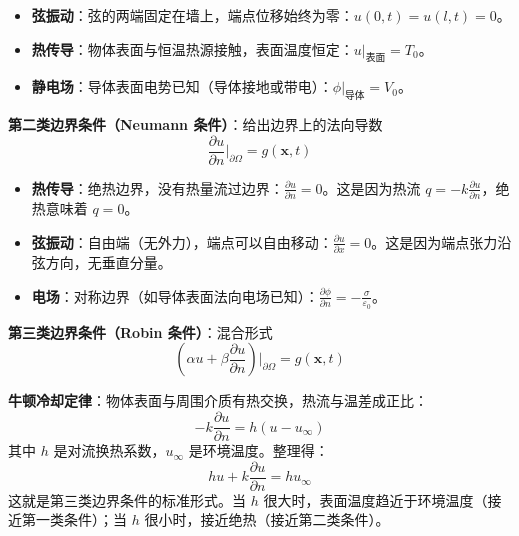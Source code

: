 \begin{tishi}[物理场景举例]
\begin{itemize}
    \item \textbf{弦振动}：弦的两端固定在墙上，端点位移始终为零：$u(0, t) = u(l, t) = 0$。
    \item \textbf{热传导}：物体表面与恒温热源接触，表面温度恒定：$u|_{\text{表面}} = T_0$。
    \item \textbf{静电场}：导体表面电势已知（导体接地或带电）：$\phi|_{\text{导体}} = V_0$。
\end{itemize}
\end{tishi}

\textbf{第二类边界条件（Neumann 条件）}：给出边界上的法向导数
\begin{equation}
    \frac{\partial u}{\partial n}\Big|_{\partial\Omega} = g(\boldsymbol{x}, t)
\end{equation}

\begin{tishi}[物理场景举例]
\begin{itemize}
    \item \textbf{热传导}：绝热边界，没有热量流过边界：$\frac{\partial u}{\partial n} = 0$。这是因为热流 $q = -k\frac{\partial u}{\partial n}$，绝热意味着 $q = 0$。
    \item \textbf{弦振动}：自由端（无外力），端点可以自由移动：$\frac{\partial u}{\partial x} = 0$。这是因为端点张力沿弦方向，无垂直分量。
    \item \textbf{电场}：对称边界（如导体表面法向电场已知）：$\frac{\partial \phi}{\partial n} = -\frac{\sigma}{\varepsilon_0}$。
\end{itemize}
\end{tishi}

\textbf{第三类边界条件（Robin 条件）}：混合形式
\begin{equation}
    \left(\alpha u + \beta\frac{\partial u}{\partial n}\right)\Big|_{\partial\Omega} = g(\boldsymbol{x}, t)
\end{equation}

\begin{tishi}[物理场景举例]
\textbf{牛顿冷却定律}：物体表面与周围介质有热交换，热流与温差成正比：
\begin{equation}
    -k\frac{\partial u}{\partial n} = h(u - u_{\infty})
\end{equation}
其中 $h$ 是对流换热系数，$u_{\infty}$ 是环境温度。整理得：
\begin{equation}
    h u + k\frac{\partial u}{\partial n} = h u_{\infty}
\end{equation}
这就是第三类边界条件的标准形式。当 $h$ 很大时，表面温度趋近于环境温度（接近第一类条件）；当 $h$ 很小时，接近绝热（接近第二类条件）。
\end{tishi}

